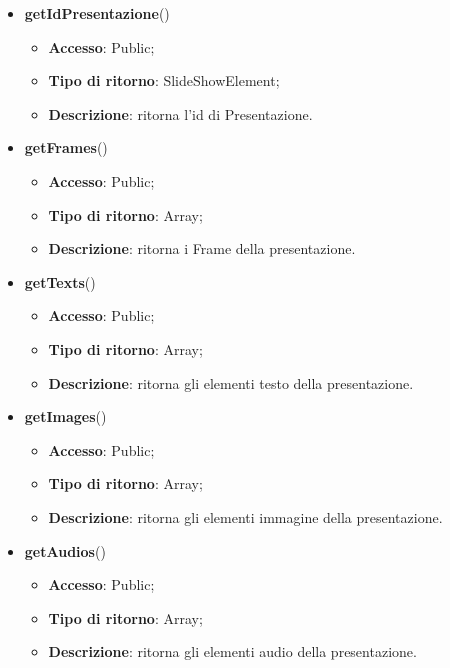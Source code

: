 {\begin{itemize}
\begin{itemize}
				\item \textbf{Tipo di ritorno}: SlideShowElement;
				\item \textbf{Descrizione}: ritorna il nome di Presentazione.
			\end{itemize}
			\item \textbf{getIdPresentazione}()
			\begin{itemize}
				\item \textbf{Accesso}: Public;
				\item \textbf{Tipo di ritorno}: SlideShowElement;
				\item \textbf{Descrizione}: ritorna l'id di Presentazione. 
			\end{itemize}
			\item \textbf{getFrames}()
			\begin{itemize}
				\item \textbf{Accesso}: Public;
				\item \textbf{Tipo di ritorno}: Array;
				\item \textbf{Descrizione}: ritorna i Frame della presentazione.
			\end{itemize}
			\item \textbf{getTexts}()
			\begin{itemize}
				\item \textbf{Accesso}: Public;
				\item \textbf{Tipo di ritorno}: Array;
				\item \textbf{Descrizione}: ritorna gli elementi testo della presentazione.
			\end{itemize}
			\item \textbf{getImages}()
			\begin{itemize}
				\item \textbf{Accesso}: Public;
				\item \textbf{Tipo di ritorno}: Array;
				\item \textbf{Descrizione}: ritorna gli elementi immagine della presentazione.
			\end{itemize}
			\item \textbf{getAudios}()
			\begin{itemize}
				\item \textbf{Accesso}: Public;
				\item \textbf{Tipo di ritorno}: Array;
				\item \textbf{Descrizione}: ritorna gli elementi audio della presentazione.
			\end{itemize}

\end{itemize}}
